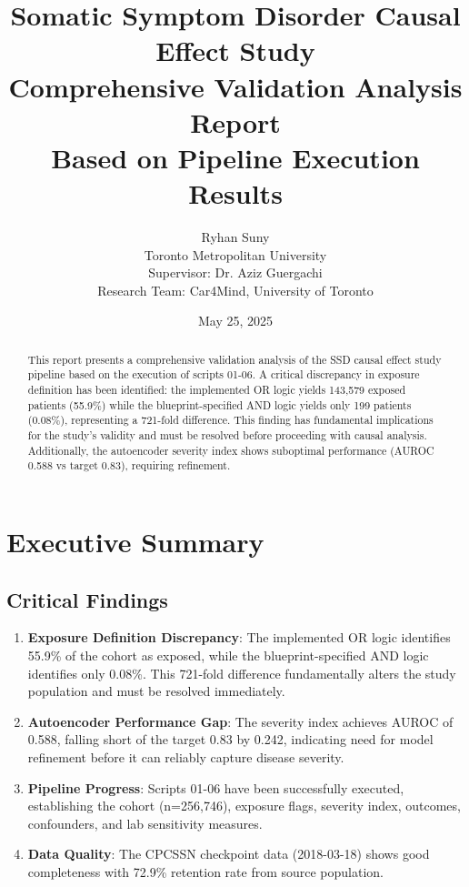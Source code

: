 \documentclass[11pt]{article}
\title{Somatic Symptom Disorder Causal Effect Study\\
\large Comprehensive Validation Analysis Report\\
\normalsize Based on Pipeline Execution Results}
\author{Ryhan Suny\\
Toronto Metropolitan University\\
Supervisor: Dr. Aziz Guergachi\\
Research Team: Car4Mind, University of Toronto}
\date{May 25, 2025}
\begin{document}
\maketitle

\begin{abstract}
This report presents a comprehensive validation analysis of the SSD causal effect study pipeline based on the execution of scripts 01-06. A critical discrepancy in exposure definition has been identified: the implemented OR logic yields 143,579 exposed patients (55.9\%) while the blueprint-specified AND logic yields only 199 patients (0.08\%), representing a 721-fold difference. This finding has fundamental implications for the study's validity and must be resolved before proceeding with causal analysis. Additionally, the autoencoder severity index shows suboptimal performance (AUROC 0.588 vs target 0.83), requiring refinement.
\end{abstract}

\tableofcontents
\newpage

\section{Executive Summary}

\subsection{Critical Findings}

\begin{enumerate}
    \item \textcolor{alertred}{\textbf{Exposure Definition Discrepancy}}: The implemented OR logic identifies 55.9\% of the cohort as exposed, while the blueprint-specified AND logic identifies only 0.08\%. This 721-fold difference fundamentally alters the study population and must be resolved immediately.
    
    \item \textbf{Autoencoder Performance Gap}: The severity index achieves AUROC of 0.588, falling short of the target 0.83 by 0.242, indicating need for model refinement before it can reliably capture disease severity.
    
    \item \textbf{Pipeline Progress}: Scripts 01-06 have been successfully executed, establishing the cohort (n=256,746), exposure flags, severity index, outcomes, confounders, and lab sensitivity measures.
    
    \item \textbf{Data Quality}: The CPCSSN checkpoint data (2018-03-18) shows good completeness with 72.9\% retention rate from source population.
\end{enumerate}
\end{document}
